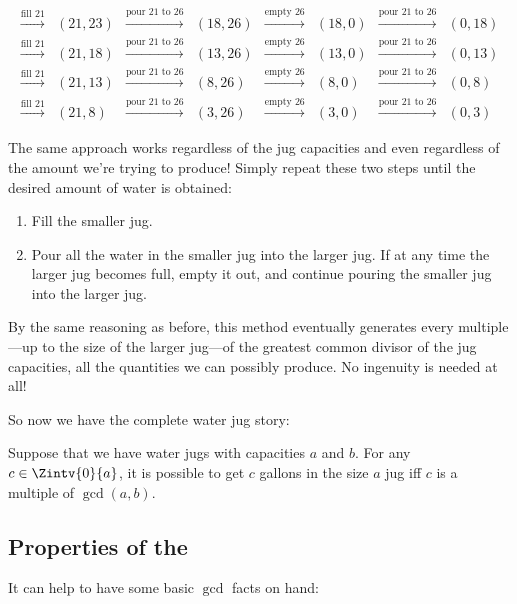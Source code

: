 \[\begin{array}{cccccccc}
\xrightarrow{\text{fill 21}} & (21,23)&
\xrightarrow{\text{pour 21 to 26}} & (18,26)& \xrightarrow{\text{empty
    26}} & (18,0)& \xrightarrow{\text{pour 21 to 26}} &
(0,18)\\
\xrightarrow{\text{fill 21}} & (21,18)&
\xrightarrow{\text{pour 21 to 26}} & (13,26)& \xrightarrow{\text{empty
    26}} & (13,0)& \xrightarrow{\text{pour 21 to 26}} &
(0,13)\\
\xrightarrow{\text{fill 21}} & (21,13)&
\xrightarrow{\text{pour 21 to 26}} & (8,26)& \xrightarrow{\text{empty
    26}} & (8,0)& \xrightarrow{\text{pour 21 to 26}} &
(0,8)\\
\xrightarrow{\text{fill 21}} & (21,8)& \xrightarrow{\text{pour
    21 to 26}} & (3,26)& \xrightarrow{\text{empty 26}} & (3,0)&
\xrightarrow{\text{pour 21 to 26}} & (0,3)
\end{array}
\]

The same approach works regardless of the jug capacities and even
regardless of the amount we're trying to produce!  Simply repeat these
two steps until the desired amount of water is obtained:
\begin{enumerate}
\item Fill the smaller jug.

\item Pour all the water in the smaller jug into the larger jug.  If
  at any time the larger jug becomes full, empty it out, and continue
  pouring the smaller jug into the larger jug.
\end{enumerate}
By the same reasoning as before, this method eventually generates
every multiple---up to the size of the larger jug---of the greatest
common divisor of the jug capacities, all the quantities we
can possibly produce.  No ingenuity is needed at all!

So now we have the complete water jug story:
\begin{theorem}\label{th:waterjugs}
Suppose that we have water jugs with capacities $a$ and $b$.  For any
$c \in \Zintv{0}{a}$, it is possible to get $c$ gallons in the size $a$ jug
iff $c$ is a multiple of $\gcd(a, b)$.
\end{theorem}

\subsection{Properties of the }

It can help to have some basic $\gcd$ facts on hand:

